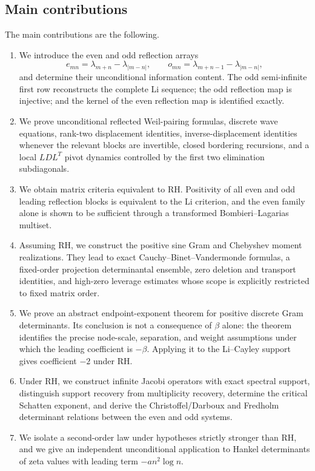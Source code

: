 \documentclass[preprint,12pt]{elsarticle}
\numberwithin{equation}{section}
\theoremstyle{plain}
\theoremstyle{definition}
\theoremstyle{remark}
\newcommand{\RH}{\mathrm{RH}}
\begin{document}
\subsection{Main contributions}
\label{subsec:main_contributions}
The main contributions are the following.
\begin{enumerate}[label=\textup{(\arabic*)},leftmargin=2.5em]
\item We introduce the even and odd reflection arrays
\[
e_{mn}=\lambda_{m+n}-\lambda_{|m-n|},
\qquad
o_{mn}=\lambda_{m+n-1}-\lambda_{|m-n|},
\]
and determine their unconditional information content.  The odd semi-infinite first row
reconstructs the complete Li sequence; the odd reflection map is injective; and the kernel of
the even reflection map is identified exactly.
\item We prove unconditional reflected Weil-pairing formulas, discrete wave equations,
rank-two displacement identities, inverse-displacement identities whenever the relevant blocks
are invertible, closed bordering recursions, and a local \(LDL^T\) pivot dynamics controlled by
the first two elimination subdiagonals.
\item We obtain matrix criteria equivalent to \(\RH\).  Positivity of all even and odd leading
reflection blocks is equivalent to the Li criterion, and the even family alone is shown to be
sufficient through a transformed Bombieri--Lagarias multiset.
\item Assuming \(\RH\), we construct the positive sine Gram and Chebyshev moment realizations.
They lead to exact Cauchy--Binet--Vandermonde formulas, a fixed-order projection determinantal
ensemble, zero deletion and transport identities, and high-zero leverage estimates whose scope
is explicitly restricted to fixed matrix order.
\item We prove an abstract endpoint-exponent theorem for positive discrete Gram determinants.
Its conclusion is not a consequence of \(\beta\) alone: the theorem identifies the precise
node-scale, separation, and weight assumptions under which the leading coefficient is
\(-\beta\).  Applying it to the Li--Cayley support gives coefficient \(-2\) under \(\RH\).
\item Under \(\RH\), we construct infinite Jacobi operators with exact spectral support,
distinguish support recovery from multiplicity recovery, determine the critical Schatten
exponent, and derive the Christoffel/Darboux and Fredholm determinant relations between the
even and odd systems.
\item We isolate a second-order law under hypotheses strictly stronger than \(\RH\), and we give
an independent unconditional application to Hankel determinants of zeta values with leading
term \(-a n^2\log n\).
\end{enumerate}
\end{document}
